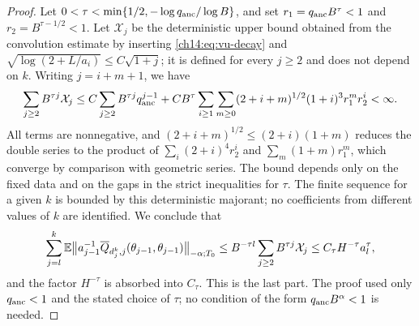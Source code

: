 \begin{proof}
Let $0<\tau<\min\{1/2,-\log q_{\mathrm{anc}}/\log B\}$, and set $r_1=q_{\mathrm{anc}} B^\tau<1$ and $r_2=B^{\tau-1/2}<1$. Let $\mathcal X_j$ be the deterministic upper bound obtained from the convolution estimate by inserting \eqref{ch14:eq:vu-decay} and $\sqrt{\log(2+L/a_i)}\le C\sqrt{1+j}$; it is defined for every $j\ge2$ and does not depend on $k$. Writing $j=i+m+1$, we have
\[
 \sum_{j\ge2}B^{\tau j}\mathcal X_j\le C\sum_{j\ge2}B^{\tau j}q_{\mathrm{anc}}^{j-1}+CB^\tau\sum_{i\ge1}\sum_{m\ge0}(2+i+m)^{1/2}(1+i)^3r_1^mr_2^i<\infty.
\]
All terms are nonnegative, and $(2+i+m)^{1/2}\le(2+i)(1+m)$ reduces the double series to the product of $\sum_i(2+i)^4r_2^i$ and $\sum_m(1+m)r_1^m$, which converge by comparison with geometric series. The bound depends only on the fixed data and on the gaps in the strict inequalities for $\tau$. The finite sequence for a given $k$ is bounded by this deterministic majorant; no coefficients from different values of $k$ are identified. We conclude that
\[
 \sum_{j=l}^k\mathbb E\bigl\lVert a_{j-1}^{-1}\overline Q_{d_j^k,j}(\theta_{j-1},\theta_{j-1})\bigr\rVert_{-\alpha;T_0}\le B^{-\tau l}\sum_{j\ge2}B^{\tau j}\mathcal X_j\le C_\tau H^{-\tau}a_l^\tau,
\]
and the factor $H^{-\tau}$ is absorbed into $C_\tau$. This is the last part. The proof used only $q_{\mathrm{anc}}<1$ and the stated choice of $\tau$; no condition of the form $q_{\mathrm{anc}} B^\alpha<1$ is needed.
\end{proof}
